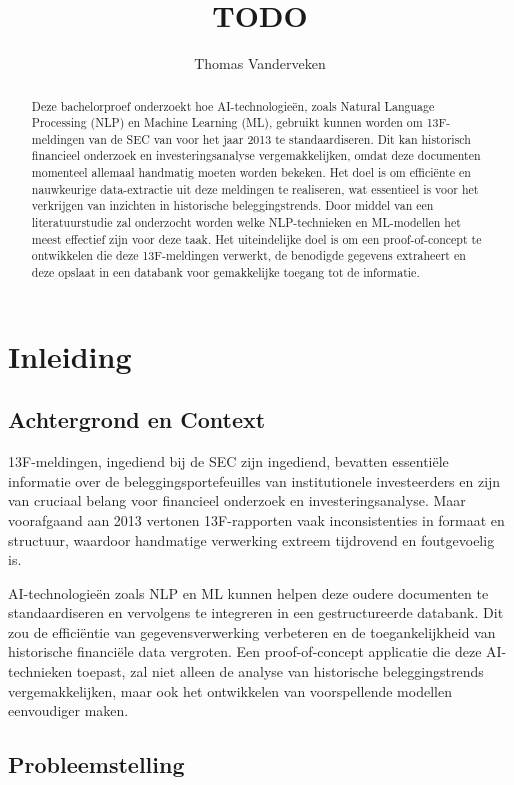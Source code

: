 \documentclass{hogent-article}
\title{TODO}
\author{Thomas Vanderveken}
\begin{document}
\begin{abstract}

    Deze bachelorproef onderzoekt hoe AI-technologieën, zoals Natural Language Processing (NLP) en Machine Learning (ML), gebruikt kunnen worden om 13F-meldingen van de SEC van voor het jaar 2013 te standaardiseren. Dit kan historisch financieel onderzoek en investeringsanalyse vergemakkelijken, omdat deze documenten momenteel allemaal handmatig moeten worden bekeken. Het doel is om efficiënte en nauwkeurige data-extractie uit deze meldingen te realiseren, wat essentieel is voor het verkrijgen van inzichten in historische beleggingstrends. Door middel van een literatuurstudie zal onderzocht worden welke NLP-technieken en ML-modellen het meest effectief zijn voor deze taak. Het uiteindelijke doel is om een proof-of-concept te ontwikkelen die deze 13F-meldingen verwerkt, de benodigde gegevens extraheert en deze opslaat in een databank voor gemakkelijke toegang tot de informatie.\end{abstract}

\tableofcontents

\bigskip

\section{Inleiding}
\subsection{Achtergrond en Context}

13F-meldingen, ingediend bij de SEC zijn ingediend, bevatten essentiële informatie over de beleggingsportefeuilles van institutionele investeerders en zijn van cruciaal belang voor financieel onderzoek en investeringsanalyse. Maar voorafgaand aan 2013 vertonen 13F-rapporten vaak inconsistenties in formaat en structuur, waardoor handmatige verwerking extreem tijdrovend en foutgevoelig is. 

AI-technologieën zoals NLP en ML kunnen helpen deze oudere documenten te standaardiseren en vervolgens te integreren in een gestructureerde databank. Dit zou de efficiëntie van gegevensverwerking verbeteren en de toegankelijkheid van historische financiële data vergroten. Een proof-of-concept applicatie die deze AI-technieken toepast, zal niet alleen de analyse van historische beleggingstrends vergemakkelijken, maar ook het ontwikkelen van voorspellende modellen eenvoudiger maken.

\subsection{Probleemstelling}
\end{document}
